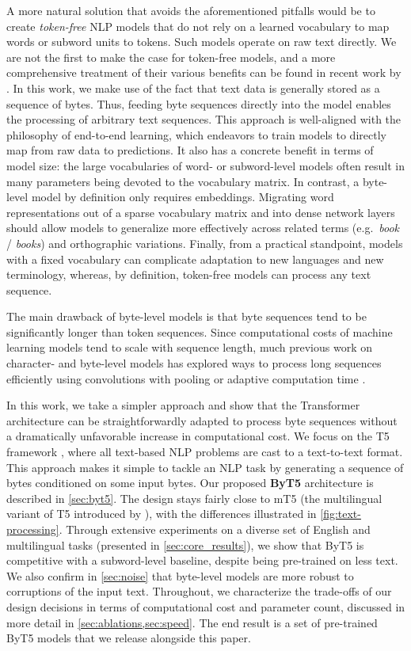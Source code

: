 \documentclass[11pt,a4paper]{article}
\begin{document}
A more natural solution that avoids the aforementioned pitfalls would be to create \textit{token-free} NLP models that do not rely on a learned vocabulary to map words or subword units to tokens.
Such models operate on raw text directly.
We are not the first to make the case for token-free models, and a more comprehensive treatment of their various benefits can be found in recent work by \citet{clark2021canine}.
In this work, we make use of the fact that text data is generally stored as a sequence of bytes.
Thus, feeding byte sequences directly into the model enables the processing of arbitrary text sequences.
This approach is well-aligned with the philosophy of end-to-end learning, which endeavors to train models to directly map from raw data to predictions.
It also has a concrete benefit in terms of model size: the large vocabularies of word- or subword-level models often result in many parameters being devoted to the vocabulary matrix.
In contrast, a byte-level model by definition only requires  embeddings.
Migrating word representations out of a sparse vocabulary matrix and into dense network layers should allow models to generalize more effectively across related terms (e.g.~\textit{book} / \textit{books}) and orthographic variations.
Finally, from a practical standpoint, models with a fixed vocabulary can complicate adaptation to new languages and new terminology, whereas, by definition, token-free models can process any text sequence.

The main drawback of byte-level models is that byte sequences tend to be significantly longer than token sequences. Since computational costs of machine learning models tend to scale with sequence length, much previous work on character- and byte-level models has explored ways to process long sequences efficiently using convolutions with pooling \cite{xiang-2015-character, lee-etal-2017-fully} or adaptive computation time \cite{graves-2016-adaptive}.

In this work, we take a simpler approach and show that the Transformer architecture can be straightforwardly adapted to process byte sequences without a dramatically unfavorable increase in computational cost.
We focus on the T5 framework \cite{raffel-2020-t5}, where all text-based NLP problems are cast to a text-to-text format.
This approach makes it simple to tackle an NLP task by generating a sequence of bytes conditioned on some input bytes.
Our proposed \textbf{ByT5} architecture is described in \cref{sec:byt5}. The design stays fairly close to mT5 (the multilingual variant of T5 introduced by \citet{mt5}), with the differences illustrated in \cref{fig:text-processing}.
Through extensive experiments on a diverse set of English and multilingual tasks (presented in \cref{sec:core_results}), we show that ByT5 is competitive with a subword-level baseline, despite being pre-trained on  less text.
We also confirm in \cref{sec:noise} that byte-level models are more robust to corruptions of the input text.
Throughout, we characterize the trade-offs of our design decisions in terms of computational cost and parameter count, discussed in more detail in \cref{sec:ablations,sec:speed}.
The end result is a set of pre-trained ByT5 models that we release alongside this paper.
\end{document}
